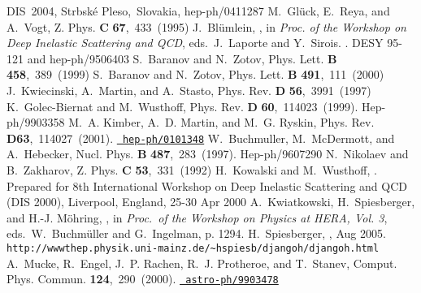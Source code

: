 \documentclass[10pt]{article} \usepackage{dina4}
\begin{document}
\begin{mcbibliography}{10}
\newblock \mbox{DIS 2004}, Strbsk\'e Pleso,~Slovakia, hep-ph/0411287\relax
\relax
{}
M.~Gl\"uck, E.~Reya, and A.~Vogt,
\newblock Z. Phys. {\bf C}{} {\bf 67},~433~(1995)\relax
\relax
{}
J.~Bl\"umlein,
,
\newblock in {\em Proc. of the Workshop on Deep Inelastic Scattering and QCD},
  eds.~J.~Laporte and Y.~Sirois.
.
\newblock \mbox{DESY} 95-121 and hep-ph/9506403\relax
\relax
{}
S.~Baranov and N.~Zotov,
\newblock Phys. Lett. {\bf B}{} {\bf 458},~389~(1999)\relax
\relax
{}
S.~Baranov and N.~Zotov,
\newblock Phys. Lett. {\bf B}{} {\bf 491},~111~(2000)\relax
\relax
{}
J.~Kwiecinski, A.~Martin, and A.~Stasto,
\newblock Phys. Rev. {\bf D}{} {\bf 56},~3991~(1997)\relax
\relax
{}
K.~Golec-Biernat and M.~Wusthoff,
\newblock Phys. Rev. {\bf D}{} {\bf 60},~114023~(1999).
\newblock Hep-ph/9903358\relax
\relax
{}
M.~A. Kimber, A.~D. Martin, and M.~G. Ryskin,
\newblock Phys. Rev.{} {\bf D63},~114027~(2001).
\newblock \href{http://www.arXiv.org/abs/hep-ph/0101348}{{\tt
  hep-ph/0101348}}\relax
\relax
{}
W.~Buchmuller, M.~McDermott, and A.~Hebecker,
\newblock Nucl. Phys. {\bf B}{} {\bf 487},~283~(1997).
\newblock Hep-ph/9607290\relax
\relax
{}
N.~Nikolaev and B.~Zakharov,
\newblock Z. Phys. {\bf C}{} {\bf 53},~331~(1992)\relax
\relax
{}
H.~Kowalski and M.~Wusthoff,
.
\newblock Prepared for 8th International Workshop on Deep Inelastic Scattering
  and QCD (DIS 2000), Liverpool, England, 25-30 Apr 2000\relax
\relax
{}
A.~Kwiatkowski, H.~Spiesberger, and H.-J. M\"ohring,
,
\newblock in {\em Proc.\ of the Workshop on Physics at HERA, Vol. 3},
  eds.~W.~Buchm\"uller and G.~Ingelman, p. 1294.
\relax
\relax
{}
H.~Spiesberger,
, Aug 2005.
\newblock
  \verb+http://wwwthep.physik.uni-mainz.de/~hspiesb/djangoh/djangoh.html+\relax
\relax
{}
A.~Mucke, R.~Engel, J.~P. Rachen, R.~J. Protheroe, and T.~Stanev,
\newblock Comput. Phys. Commun.{} {\bf 124},~290~(2000).
\newblock \href{http://www.arXiv.org/abs/astro-ph/9903478}{{\tt
  astro-ph/9903478}}\relax

\end{mcbibliography}
\end{document}
